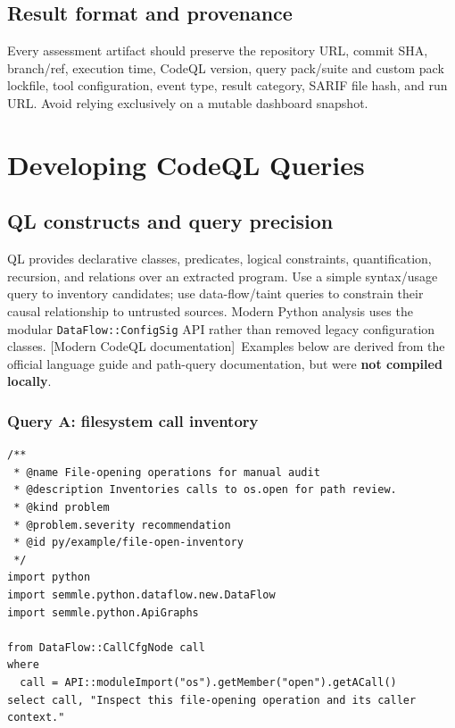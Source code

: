 \documentclass[11pt,letterpaper,oneside]{book}
\newcommand{\srcM}{\textsf{[Modern CodeQL documentation]}}
\begin{document}
\section{Result format and provenance}

Every assessment artifact should preserve the repository URL, commit SHA, branch/ref, execution time, CodeQL version, query pack/suite and custom pack lockfile, tool configuration, event type, result category, SARIF file hash, and run URL. Avoid relying exclusively on a mutable dashboard snapshot.

\chapter{Developing CodeQL Queries}

\section{QL constructs and query precision}

QL provides declarative classes, predicates, logical constraints, quantification, recursion, and relations over an extracted program. Use a simple syntax/usage query to inventory candidates; use data-flow/taint queries to constrain their causal relationship to untrusted sources. Modern Python analysis uses the modular \texttt{DataFlow::ConfigSig} API rather than removed legacy configuration classes. \srcM\ Examples below are derived from the official language guide and path-query documentation, but were \textbf{not compiled locally}.

\subsection{Query A: filesystem call inventory}

\begin{lstlisting}[caption={CodeQL/Python: candidate-point query from official API idioms}]
/**
 * @name File-opening operations for manual audit
 * @description Inventories calls to os.open for path review.
 * @kind problem
 * @problem.severity recommendation
 * @id py/example/file-open-inventory
 */
import python
import semmle.python.dataflow.new.DataFlow
import semmle.python.ApiGraphs

from DataFlow::CallCfgNode call
where
  call = API::moduleImport("os").getMember("open").getACall()
select call, "Inspect this file-opening operation and its caller context."
\end{lstlisting}
\end{document}
